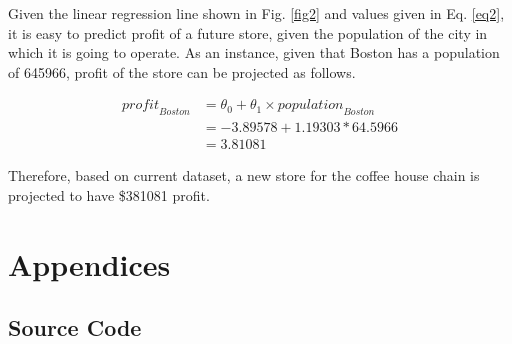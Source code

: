 \documentclass[12pt,letterpaper,twoside]{article}
\begin{document}
Given the linear regression line shown in Fig. \ref{fig2} and values given in Eq. \ref{eq2}, it is easy to predict profit of a future store, given the population of the city in which it is going to operate.
As an instance, given that Boston has a population of 645966, profit of the store can be projected as follows.

\begin{equation}\label{eq5}
\begin{split}
\mathit{profit}_\mathit{Boston} & = \theta_0 + \theta_1 \times \mathit{population}_\mathit{Boston} \\
 & = -3.89578 + 1.19303 * 64.5966 \\
 & = 3.81081
\end{split}
\end{equation}

Therefore, based on current dataset, a new store for the coffee house chain is projected to have \$381081 profit.

\cleardoublepage

\section*{Appendices}

\subsection*{Source Code}

\lstset{language=r,tabsize=4}

\end{document}
